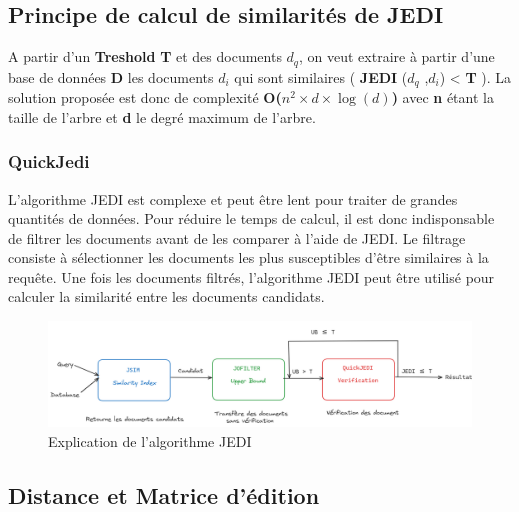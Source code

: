         \subsection{Principe de calcul de similarités de JEDI}
            A partir d'un \textbf{Treshold} \textbf{T} et des documents \textbf{$d_{q}$}, on veut extraire à partir d’une base de données \textbf{D} les documents \textbf{$d_{i}$} qui sont similaires ( \textbf{JEDI} (\textbf{$d_{q}$} ,\textbf{$d_{i}$}) < \textbf{T} ). La solution proposée est donc de complexité \textbf{O($n^{2}\times d \times \log(d)$)} avec \textbf{n} étant la taille de l'arbre et \textbf{d} le degré maximum de l'arbre. 
        \subsubsection{QuickJedi}
            L'algorithme JEDI est complexe et peut être lent pour traiter de grandes quantités de données. Pour réduire le temps de calcul, il est donc indisponsable de filtrer les documents avant de les comparer à l'aide de JEDI. Le filtrage consiste à sélectionner les documents les plus susceptibles d'être similaires à la requête. Une fois les documents filtrés, l'algorithme JEDI peut être utilisé pour calculer la similarité entre les documents candidats.

            \begin{figure}[H]
                \centering
                \includegraphics[width=\linewidth]{Photos/QuickJedi.PNG}
                \caption{Explication de l'algorithme JEDI\cite{JEDI}}

            \end{figure}
        \subsection{Distance et Matrice d'édition}
